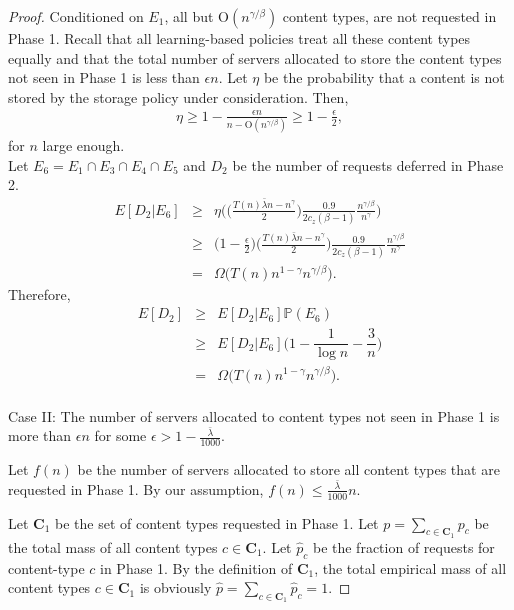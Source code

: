 \documentclass[10pt, conference, letterpaper]{IEEEtran}
\def \OO {\mathrm{O}}
\begin{document}
\begin{proof}
	Conditioned on $E_1$, all but $\OO(n^{{\gamma}/{\beta}})$ content types, are not requested in Phase 1. Recall that all learning-based policies treat all these content types equally and that the total number of servers allocated to store the content types not seen in Phase 1 is less than $ \epsilon n$. Let $\eta$ be the probability that a content is not stored by the storage policy under consideration. Then,
	\begin{eqnarray*}
		\eta \geq 1 - \frac{\epsilon n}{n - \OO(n^{{\gamma}/{\beta}})} \geq 1- \frac{\epsilon}{2},
	\end{eqnarray*}
	for $n$ large enough. \\
	
	Let $E_6 = E_1 \cap E_3 \cap E_4 \cap E_5$ and $D_2$ be the number of requests deferred in Phase 2.
	\begin{eqnarray*}
		E[D_2 | E_6] &\geq& \eta \bigg(\bigg(\frac{T(n) \bar{\lambda} n- n^{\gamma}}{2}\bigg)\frac{0.9}{2 c_z (\beta -1)} \frac{n^{\gamma/\beta}}{n^{\gamma}}\bigg)\\
		&\geq& \bigg(1-\frac{\epsilon}{2}\bigg) \bigg(\frac{T(n) \bar{\lambda} n- n^{\gamma}}{2}\bigg)\frac{0.9}{2 c_z (\beta -1)} \frac{n^{\gamma/\beta}}{n^{\gamma}} \\
		& = & \Omega \big(T(n)n^{1-\gamma}n^{\gamma/\beta}\big).
	\end{eqnarray*}
	Therefore,
	\begin{eqnarray*}
		E[D_2] &\geq& E[D_2 | E_6] \mathbb{P}(E_6)\\
		&\geq& E[D_2 | E_6] \bigg(1- \dfrac{1}{\log n} - \dfrac{3}{n}\bigg) \\
		&=& \Omega \big(T(n)n^{1-\gamma}n^{\gamma/\beta}\big). \\
	\end{eqnarray*}
	
	\noindent Case II: The number of servers allocated to content types not seen in Phase 1 is more than $\epsilon n$ for some $\epsilon > 1-\frac{\bar{\lambda}}{1000}$.
	
	Let $f(n)$ be the number of servers allocated to store all content types that are requested in Phase 1. By our assumption, $f(n) \leq \frac{\bar{\lambda}}{1000} n$.
	
	Let $\mathbf{C}_{1}$ be the set of content types requested in Phase 1. Let $p = \sum_{c \in \mathbf{C}_{1}} p_c $ be the total mass of all content types $c \in \mathbf{C}_{1}$. Let $\hat{p}_c$ be the fraction of requests for content-type $c$ in Phase 1. By the definition of $\mathbf{C}_{1}$, the total empirical mass of all content types $c \in \mathbf{C}_{1}$ is obviously $\hat{p} = \sum_{c \in \mathbf{C}_{1}} \hat{p}_c  = 1$.
	

\end{proof}
\end{document}
